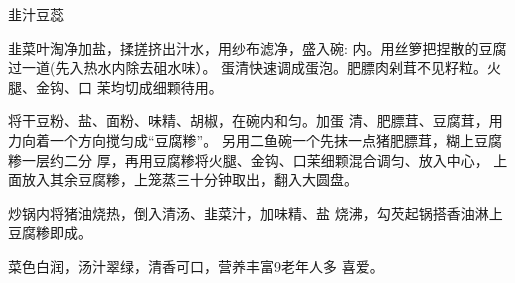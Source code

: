 \begin{recipe}{韭汁豆蕊}

\ingredients


\cooking

\step 	韭菜叶淘净加盐，揉搓挤出汁水，用纱布滤净，盛入碗: 内。用丝箩把捏散的豆腐过一道(先入热水内除去砠水味）。 蛋清快速调成蛋泡。肥膘肉剁茸不见籽粒。火腿、金钩、口 茉均切成细颗待用。

\step 	将干豆粉、盐、面粉、味精、胡椒，在碗内和匀。加蛋 清、肥膘茸、豆腐茸，用力向着一个方向搅匀成“豆腐糁”。 另用二鱼碗一个先抹一点猪肥膘茸，糊上豆腐糁一层约二分 厚，再用豆腐糁将火腿、金钩、口茉细颗混合调匀、放入中心， 上面放入其余豆腐糁，上笼蒸三十分钟取出，翻入大圆盘。

\step 	炒锅内将猪油烧热，倒入清汤、韭菜汁，加味精、盐 烧沸，勾芡起锅搭香油淋上豆腐糁即成。

\notes

菜色白润，汤汁翠绿，清香可口，营养丰富9老年人多 喜爱。

\end{recipe}


